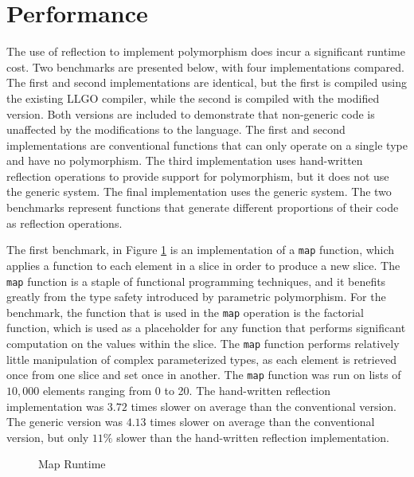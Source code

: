 \documentclass[letterpaper,twocolumn,11pt]{article}
\begin{document}
\section{Performance} \label{results}

The use of reflection to implement polymorphism does incur a significant runtime cost. Two benchmarks are presented below, with four implementations compared. The first and second implementations are identical, but the first is compiled using the existing LLGO compiler, while the second is compiled with the modified version. Both versions are included to demonstrate that non-generic code is unaffected by the modifications to the language. The first and second implementations are conventional functions that can only operate on a single type and have no polymorphism. The third implementation uses hand-written reflection operations to provide support for polymorphism, but it does not use the generic system. The final implementation uses the generic system. The two benchmarks represent functions that generate different proportions of their code as reflection operations. 

The first benchmark, in Figure \ref{fig:map} is an implementation of a \texttt{map} function, which applies a function to each element in a slice in order to produce a new slice. The \texttt{map} function is a staple of functional programming techniques, and it benefits greatly from the type safety introduced by parametric polymorphism. For the benchmark, the function that is used in the \texttt{map} operation is the factorial function, which is used as a placeholder for any function that performs significant computation on the values within the slice. The \texttt{map} function performs relatively little manipulation of complex parameterized types, as each element is retrieved once from one slice and set once in another. The \texttt{map} function was run on lists of $10,000$ elements ranging from 0 to 20. The hand-written reflection implementation was $3.72$ times slower on average than the conventional version. The generic version was $4.13$ times slower on average than the conventional version, but only $11\%$ slower than the hand-written reflection implementation.

\begin{figure}
    \caption{Map Runtime\label{fig:map}}
    \centering
    
\end{figure}
\end{document}
